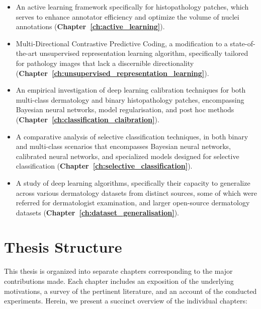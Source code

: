 \begin{itemize}
	
	\item An active learning framework specifically for histopathology patches, which serves to enhance annotator efficiency and optimize the volume of nuclei annotations (\textbf{Chapter~\ref{ch:active_learning}}).
	
	\item Multi-Directional Contrastive Predictive Coding, a modification to a state-of-the-art unsupervised representation learning algorithm, specifically tailored for pathology images that lack a discernible directionality (\textbf{Chapter~\ref{ch:unsupervised_representation_learning}}).
	
	\item An empirical investigation of deep learning calibration techniques for both multi-class dermatology and binary histopathology patches, encompassing Bayesian neural networks, model regularisation, and post hoc methods (\textbf{Chapter~\ref{ch:classification_claibration}}).
	
	\item A comparative analysis of selective classification techniques, in both binary and multi-class scenarios that encompasses Bayesian neural networks, calibrated neural networks, and specialized models designed for selective classification (\textbf{Chapter~\ref{ch:selective_classification}}).
	
	\item A study of deep learning algorithms, specifically their capacity to generalize across various dermatology datasets from distinct sources, some of which were referred for dermatologist examination, and larger open-source dermatology datasets (\textbf{Chapter~\ref{ch:dataset_generalisation}}).
	
\end{itemize}



\section{Thesis Structure}
\label{sec:thesis_structure}
This thesis is organized into separate chapters corresponding to the major contributions made. Each chapter includes an exposition of the underlying motivations, a survey of the pertinent literature, and an account of the conducted experiments. Herein, we present a succinct overview of the individual chapters:

